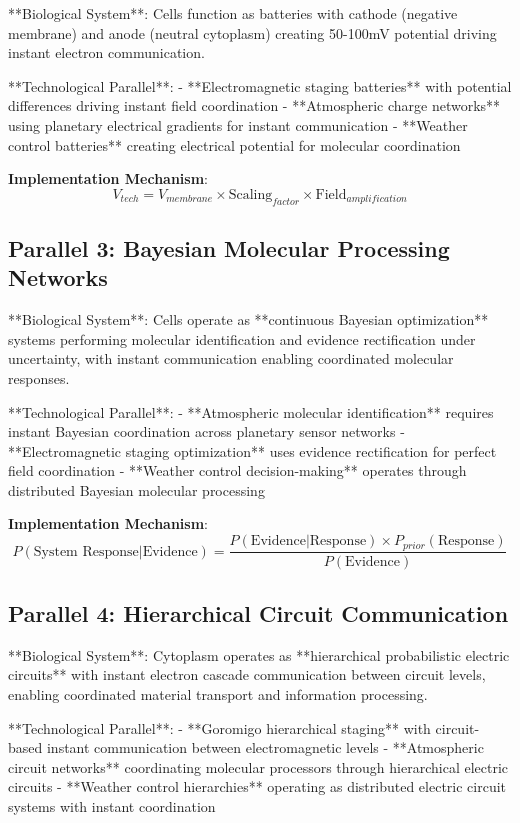 \documentclass[12pt,a4paper]{article}
\begin{document}
**Biological System**: Cells function as batteries with cathode (negative membrane) and anode (neutral cytoplasm) creating 50-100mV potential driving instant electron communication.

**Technological Parallel**:
- **Electromagnetic staging batteries** with potential differences driving instant field coordination
- **Atmospheric charge networks** using planetary electrical gradients for instant communication
- **Weather control batteries** creating electrical potential for molecular coordination

\textbf{Implementation Mechanism}:
$$V_{tech} = V_{membrane} \times \text{Scaling}_{factor} \times \text{Field}_{amplification}$$

\subsection{Parallel 3: Bayesian Molecular Processing Networks}

**Biological System**: Cells operate as **continuous Bayesian optimization** systems performing molecular identification and evidence rectification under uncertainty, with instant communication enabling coordinated molecular responses.

**Technological Parallel**:
- **Atmospheric molecular identification** requires instant Bayesian coordination across planetary sensor networks
- **Electromagnetic staging optimization** uses evidence rectification for perfect field coordination
- **Weather control decision-making** operates through distributed Bayesian molecular processing

\textbf{Implementation Mechanism}:
$$P(\text{System Response}|\text{Evidence}) = \frac{P(\text{Evidence}|\text{Response}) \times P_{prior}(\text{Response})}{P(\text{Evidence})}$$

\subsection{Parallel 4: Hierarchical Circuit Communication}

**Biological System**: Cytoplasm operates as **hierarchical probabilistic electric circuits** with instant electron cascade communication between circuit levels, enabling coordinated material transport and information processing.

**Technological Parallel**:
- **Goromigo hierarchical staging** with circuit-based instant communication between electromagnetic levels
- **Atmospheric circuit networks** coordinating molecular processors through hierarchical electric circuits
- **Weather control hierarchies** operating as distributed electric circuit systems with instant coordination
\end{document}
